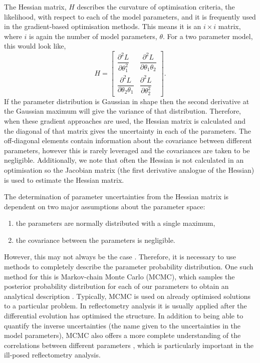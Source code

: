 \documentclass[
 reprint,
 superscriptaddress,
 amsmath,amssymb,
 aps,
]{revtex4-1}
\begin{document}
The Hessian matrix, $H$ describes the curvature of optimisation criteria, the likelihood, with respect to each of the model parameters, and it is frequently used in the gradient-based optimisation methods.
This means it is an $i\times i$ matrix, where $i$ is again the number of model parameters, $\theta$. For a two parameter model, this would look like,
%
\begin{equation}
    H =
    \left[\begin{matrix}
        \dfrac{\partial^2 L}{\partial \theta_{1}^2} & \dfrac{\partial^2 L}{\partial \theta_1 \theta_2} \\[6pt]
        \dfrac{\partial^2 L}{\partial \theta_2 \theta_1} & \dfrac{\partial^2 L}{\partial \theta_{2}^2}
    \end{matrix}\right].
\end{equation}
%
If the parameter distribution is Gaussian in shape then the second derivative at the Gaussian maximum will give the variance of that distribution.
Therefore, when these gradient approaches are used, the Hessian matrix is calculated and the diagonal of that matrix gives the uncertainty in each of the parameters.
The off-diagonal elements contain information about the covariance between different parameters, however this is rarely leveraged and the covariances are taken to be negligible.
Additionally, we note that often the Hessian is not calculated in an optimisation so the Jacobian matrix (the first derivative analogue of the Hessian) is used to estimate the Hessian matrix.

The determination of parameter uncertainties from the Hessian matrix is dependent on two major assumptions about the parameter space:
\begin{enumerate}
    \item {the parameters are normally distributed with a single maximum,}
    \item {the covariance between the parameters is negligible.}
\end{enumerate}
However, this may not always be the case \cite{mccluskey_bayesian_2019}. Therefore, it is necessary to use methods to completely describe the parameter probability distribution.
One such method for this is Markov-chain Monte Carlo (MCMC), which samples the posterior probability distribution for each of our parameters to obtain an analytical description \cite{sivia_data_2006}.
Typically, MCMC is used on already optimised solutions to a particular problem. In reflectometry analysis it is usually applied after the differential evolution has optimised the structure.
In addition to being able to quantify the inverse uncertainties (the name given to the uncertainties in the model parameters), MCMC also offers a more complete understanding of the correlations between different parameters \cite{gilks_markov_1995}, which is particularly important in the ill-posed reflectometry analysis.
\end{document}

